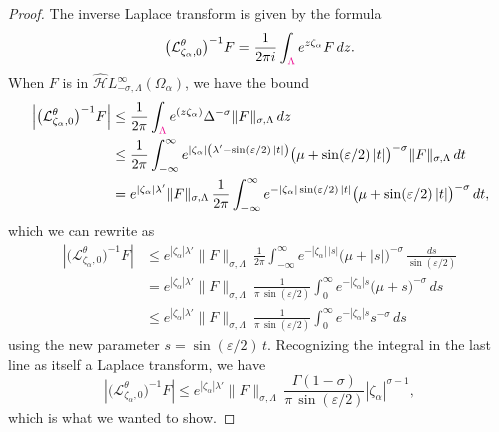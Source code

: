 \documentclass{article}
\let\Re\relax
\DeclareMathOperator{\Re}{Re}
\newcommand{\dualsingexp}[2]{\widehat{\mathcal{H}}L^\infty_{#1, #2}}
\newcommand{\laplace}{\mathcal{L}}
\theoremstyle{definition}
\theoremstyle{plain}
\begin{document}
\begin{proof}
The inverse Laplace transform is given by the formula
\[ \big(\laplace_{\zeta_\alpha, 0}^\theta\big)^{-1} F = \frac{1}{2 \pi i} \int_{\textcolor{magenta}{\Lambda}} e^{z\zeta_\alpha} F\,dz. \]
When $F$ is in $\dualsingexp{-\sigma}{\Lambda}(\Omega_\alpha)$, we have the bound
\begin{align*}
\left|\big(\laplace_{\zeta_\alpha, 0}^\theta\big)^{-1} F\right| & \le \frac{1}{2 \pi} \int_{\textcolor{magenta}{\Lambda}} e^{\Re(z\zeta_\alpha)} \Delta^{-\sigma} \|F\|_{\sigma, \Lambda}\,dz \\
& \le \frac{1}{2 \pi} \int_{-\infty}^\infty e^{|\zeta_\alpha| \left(\lambda' - \sin(\varepsilon/2)\,|t|\right)} \big(\mu + \sin(\varepsilon/2)\,|t|\big)^{-\sigma} \|F\|_{\sigma, \Lambda}\,dt \\
& = e^{|\zeta_\alpha| \lambda'} \|F\|_{\sigma, \Lambda}\,\frac{1}{2 \pi} \int_{-\infty}^\infty e^{-|\zeta_\alpha| \sin(\varepsilon/2)\,|t|} \big(\mu + \sin(\varepsilon/2)\,|t|\big)^{-\sigma}\,dt,
\end{align*}
which we can rewrite as
\begin{align*}
\left|\big(\laplace_{\zeta_\alpha, 0}^\theta\big)^{-1} F\right| & \le e^{|\zeta_\alpha| \lambda'} \|F\|_{\sigma, \Lambda}\,\frac{1}{2 \pi} \int_{-\infty}^\infty e^{-|\zeta_\alpha| \,|s|} \big(\mu + |s|\big)^{-\sigma}\,\frac{ds}{\sin(\varepsilon/2)} \\
& = e^{|\zeta_\alpha| \lambda'} \|F\|_{\sigma, \Lambda}\,\frac{1}{\pi\,\sin(\varepsilon/2)} \int_0^\infty e^{-|\zeta_\alpha|s} \big(\mu + s\big)^{-\sigma}\,ds \\
& \le e^{|\zeta_\alpha| \lambda'} \|F\|_{\sigma, \Lambda}\,\frac{1}{\pi\,\sin(\varepsilon/2)} \int_0^\infty e^{-|\zeta_\alpha|s} s^{-\sigma}\,ds
\end{align*}
using the new parameter $s = \sin(\varepsilon/2)\,t$. Recognizing the integral in the last line as itself a Laplace transform, we have
\[ \left|\big(\laplace_{\zeta_\alpha, 0}^\theta\big)^{-1} F\right| \le e^{|\zeta_\alpha| \lambda'} \|F\|_{\sigma, \Lambda}\,\frac{\Gamma(1-\sigma)}{\pi\,\sin(\varepsilon/2)} |\zeta_\alpha|^{\sigma-1}, \]
which is what we wanted to show.


\end{proof}
\end{document}
